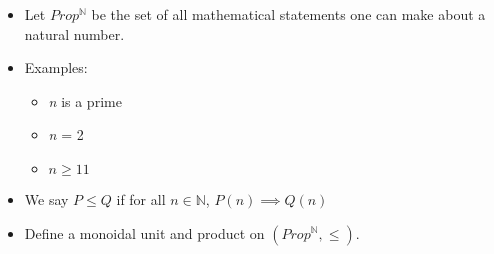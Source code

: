 
\begin{itemize}
    \item Let $Prop^\mathbb{N}$ be the set of all mathematical statements one can make about a natural number.
    \item Examples:
          \begin{itemize}
            \item \emph{n} is a prime
            \item \emph{n} = 2
            \item $n \geq 11$
          \end{itemize}
    \item We say $P \leq Q$ if for all $n \in \mathbb{N}$, $P(n) \implies Q(n)$
    \item Define a monoidal unit and product on $(Prop^\mathbb{N}, \leq)$.
  \end{itemize}